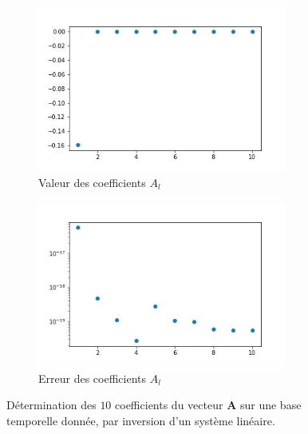 \documentclass[12pt]{report}
\begin{document}
\begin{figure}
    \centering
    \begin{subfigure}[b]{0.4\textwidth}
        \centering
        \includegraphics[width=0.9\textwidth,height=0.9\textwidth]{coefs_1_inv.jpg}
        \caption{Valeur des coefficients $A_l$}
    \end{subfigure}
    \hfill
    \begin{subfigure}[b]{0.4\textwidth}
        \centering
        \includegraphics[width=0.9\textwidth,height=0.9\textwidth]{coefs_1_inv_erreur.jpg}
        \caption{Erreur des coefficients $A_l$}
    \end{subfigure}
    \caption{Détermination des $10$ coefficients du vecteur $\bm{A}$ sur une base temporelle donnée, par inversion d'un système linéaire.}
    \label{fig:resultats_1_inv}
\end{figure}
\end{document}
